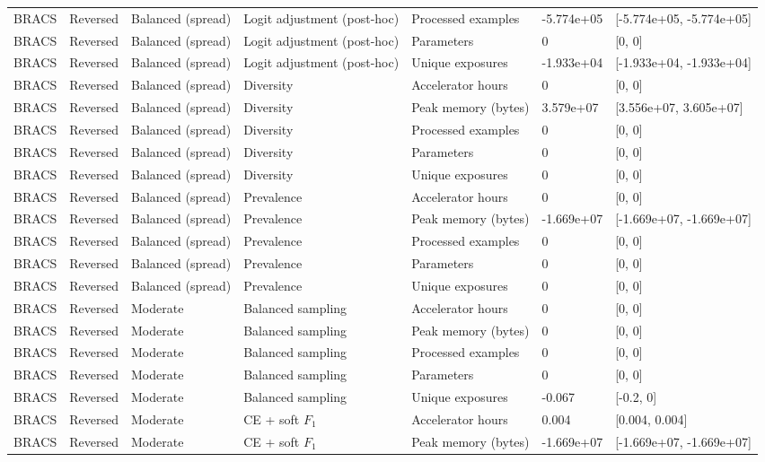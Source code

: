\begin{longtable}{lllllll}
BRACS & Reversed & Balanced (spread) & Logit adjustment (post-hoc) & Processed examples & -5.774e+05 & [-5.774e+05, -5.774e+05] \\
BRACS & Reversed & Balanced (spread) & Logit adjustment (post-hoc) & Parameters & 0 & [0, 0] \\
BRACS & Reversed & Balanced (spread) & Logit adjustment (post-hoc) & Unique exposures & -1.933e+04 & [-1.933e+04, -1.933e+04] \\
BRACS & Reversed & Balanced (spread) & Diversity & Accelerator hours & 0 & [0, 0] \\
BRACS & Reversed & Balanced (spread) & Diversity & Peak memory (bytes) & 3.579e+07 & [3.556e+07, 3.605e+07] \\
BRACS & Reversed & Balanced (spread) & Diversity & Processed examples & 0 & [0, 0] \\
BRACS & Reversed & Balanced (spread) & Diversity & Parameters & 0 & [0, 0] \\
BRACS & Reversed & Balanced (spread) & Diversity & Unique exposures & 0 & [0, 0] \\
BRACS & Reversed & Balanced (spread) & Prevalence & Accelerator hours & 0 & [0, 0] \\
BRACS & Reversed & Balanced (spread) & Prevalence & Peak memory (bytes) & -1.669e+07 & [-1.669e+07, -1.669e+07] \\
BRACS & Reversed & Balanced (spread) & Prevalence & Processed examples & 0 & [0, 0] \\
BRACS & Reversed & Balanced (spread) & Prevalence & Parameters & 0 & [0, 0] \\
BRACS & Reversed & Balanced (spread) & Prevalence & Unique exposures & 0 & [0, 0] \\
BRACS & Reversed & Moderate & Balanced sampling & Accelerator hours & 0 & [0, 0] \\
BRACS & Reversed & Moderate & Balanced sampling & Peak memory (bytes) & 0 & [0, 0] \\
BRACS & Reversed & Moderate & Balanced sampling & Processed examples & 0 & [0, 0] \\
BRACS & Reversed & Moderate & Balanced sampling & Parameters & 0 & [0, 0] \\
BRACS & Reversed & Moderate & Balanced sampling & Unique exposures & -0.067 & [-0.2, 0] \\
BRACS & Reversed & Moderate & CE + soft $F_1$ & Accelerator hours & 0.004 & [0.004, 0.004] \\
BRACS & Reversed & Moderate & CE + soft $F_1$ & Peak memory (bytes) & -1.669e+07 & [-1.669e+07, -1.669e+07] \\

\end{longtable}
